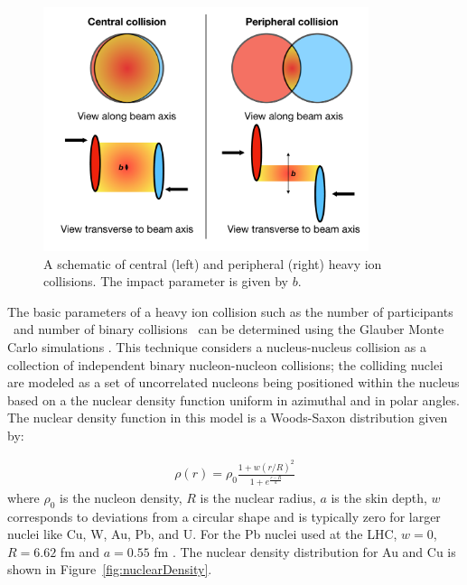 \begin{figure}[htbp]
\begin{center}
\includegraphics[width=0.85\textwidth]{figures/theory/collision_centrality}
\caption{A schematic of central (left) and peripheral (right) heavy ion collisions.
The impact parameter is given by $b$.}
\label{fig:collision_centrality}
\end{center}
\end{figure}


The basic parameters of a heavy ion collision such as the number of participants \Npart\ and number of binary collisions \Ncoll\ can be determined using the Glauber Monte Carlo simulations \cite{glauberArticle, glauberMisc}.
This technique considers a nucleus-nucleus collision as a collection of independent binary nucleon-nucleon collisions; the colliding nuclei are modeled as a set of uncorrelated nucleons being positioned within the nucleus based on a the nuclear density function uniform in azimuthal and in polar angles.
The nuclear density function in this model is a Woods-Saxon distribution given by: 

\begin{align}
\rho(r) = \rho_0 \frac{1 + w (r/R)^2}{1+e^{\frac{r-R}{a}}}
\end{align}
where $\rho_0$ is the nucleon density, $R$ is the nuclear radius, $a$ is the skin depth, $w$ corresponds to deviations from a circular shape and is typically zero for larger nuclei like Cu, W, Au, Pb, and U.
For the Pb nuclei used at the LHC, $w = 0$, $R = 6.62$ fm and $a =0.55$ fm \cite{DEVRIES1987495}.
The nuclear density distribution for Au and Cu is shown in Figure~\ref{fig:nuclearDensity}.

